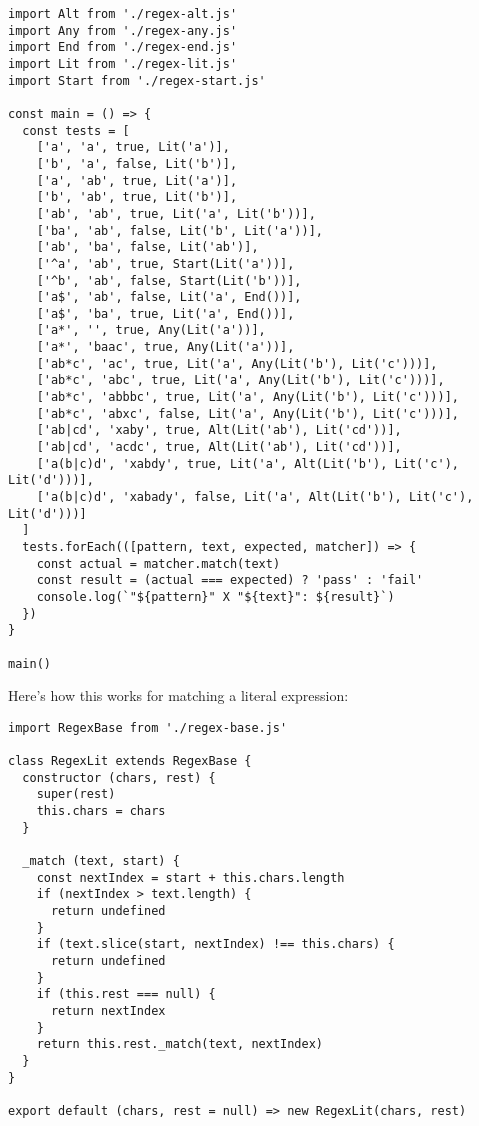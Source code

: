 \documentclass[krantzl]{krantz}
\begin{document}
\begin{lstlisting}[frame=single,frameround=tttt]
import Alt from './regex-alt.js'
import Any from './regex-any.js'
import End from './regex-end.js'
import Lit from './regex-lit.js'
import Start from './regex-start.js'

const main = () => {
  const tests = [
    ['a', 'a', true, Lit('a')],
    ['b', 'a', false, Lit('b')],
    ['a', 'ab', true, Lit('a')],
    ['b', 'ab', true, Lit('b')],
    ['ab', 'ab', true, Lit('a', Lit('b'))],
    ['ba', 'ab', false, Lit('b', Lit('a'))],
    ['ab', 'ba', false, Lit('ab')],
    ['^a', 'ab', true, Start(Lit('a'))],
    ['^b', 'ab', false, Start(Lit('b'))],
    ['a$', 'ab', false, Lit('a', End())],
    ['a$', 'ba', true, Lit('a', End())],
    ['a*', '', true, Any(Lit('a'))],
    ['a*', 'baac', true, Any(Lit('a'))],
    ['ab*c', 'ac', true, Lit('a', Any(Lit('b'), Lit('c')))],
    ['ab*c', 'abc', true, Lit('a', Any(Lit('b'), Lit('c')))],
    ['ab*c', 'abbbc', true, Lit('a', Any(Lit('b'), Lit('c')))],
    ['ab*c', 'abxc', false, Lit('a', Any(Lit('b'), Lit('c')))],
    ['ab|cd', 'xaby', true, Alt(Lit('ab'), Lit('cd'))],
    ['ab|cd', 'acdc', true, Alt(Lit('ab'), Lit('cd'))],
    ['a(b|c)d', 'xabdy', true, Lit('a', Alt(Lit('b'), Lit('c'), Lit('d')))],
    ['a(b|c)d', 'xabady', false, Lit('a', Alt(Lit('b'), Lit('c'), Lit('d')))]
  ]
  tests.forEach(([pattern, text, expected, matcher]) => {
    const actual = matcher.match(text)
    const result = (actual === expected) ? 'pass' : 'fail'
    console.log(`"${pattern}" X "${text}": ${result}`)
  })
}

main()
\end{lstlisting}



Here's how this works for matching a literal expression:


\begin{lstlisting}[frame=single,frameround=tttt]
import RegexBase from './regex-base.js'

class RegexLit extends RegexBase {
  constructor (chars, rest) {
    super(rest)
    this.chars = chars
  }

  _match (text, start) {
    const nextIndex = start + this.chars.length
    if (nextIndex > text.length) {
      return undefined
    }
    if (text.slice(start, nextIndex) !== this.chars) {
      return undefined
    }
    if (this.rest === null) {
      return nextIndex
    }
    return this.rest._match(text, nextIndex)
  }
}

export default (chars, rest = null) => new RegexLit(chars, rest)
\end{lstlisting}
\end{document}
